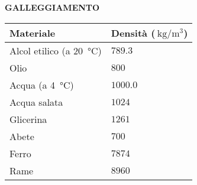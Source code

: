 

\begin{center}
    \textbf{\Large \sffamily GALLEGGIAMENTO}
\end{center}\vspace{\baselineskip}


\centering\begin{tabular}{ll}
    \textbf{Materiale}  & \textbf{Densità} ($\SI{}{\kilogram/\meter^3}$) \\ \hline
    Alcol etilico (a \SI{20}{\celsius}) & $\num{789.3}$\\ \hline
    Olio & $\num{800}$\\ \hline
    Acqua (a \SI{4}{\celsius}) & $\num{1000.0}$\\ \hline
    Acqua salata & $\num{1024}$ \\ \hline
    Glicerina & $\num{1261}$\\ \hline
    Abete & $\num{700}$ \\ \hline
    Ferro & $\num{7874}$\\ \hline
    Rame & $\num{8960}$\\ \hline
\end{tabular}

